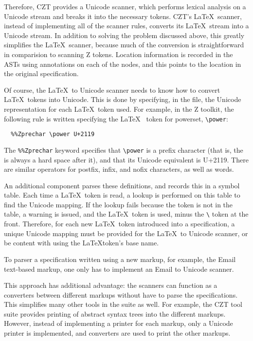 \documentclass{llncs}
\begin{document}
Therefore, CZT provides a Unicode scanner, which performs lexical
analysis on a Unicode stream and breaks it into the necessary
tokens. CZT's \LaTeX~scanner, instead of implementing all of the
scanner rules, converts its \LaTeX~stream into a Unicode stream. In
addition to solving the problem discussed above, this greatly
simplifies the \LaTeX~scanner, because much of the conversion is
straightforward in comparision to scanning Z tokens. Location
information is recorded in the ASTs using annotations on each of the
nodes, and this points to the location in the original specification.

Of course, the \LaTeX~to Unicode scanner needs to know how to convert
\LaTeX~tokens into Unicode. This is done by specifying, in the file,
the Unicode representation for each \LaTeX~token used. For example, in
the Z toolkit, the following rule is written specifying the \LaTeX~
token for powerset, \verb+\power+:
\begin{verbatim}
  %%Zprechar \power U+2119
\end{verbatim}

The {\tt \%\%Zprechar} keyword specifies that \verb+\power+ is a
prefix character (that is, the is always a hard space after it), and
that its Unicode equivalent is U+2119. There are similar operators for
postfix, infix, and nofix characters, as well as words.

An additional component parses these definitions, and records this in
a symbol table. Each time a \LaTeX~token is read, a lookup is
performed on this table to find the Unicode mapping. If the lookup
fails because the token is not in the table, a warning is issued, and
the \LaTeX~token is used, minus the \verb+\+ token at the
front. Therefore, for each new \LaTeX~token introduced into a
specification, a unique Unicode mapping must be provided for the
\LaTeX~to Unicode scanner, or be content with using the \LaTeX token's
base name.

To parser a specification written using a new markup, for example, the
Email text-based markup, one only has to implement an Email to Unicode
scanner.

This approach has additional advantage: the scanners can function as a
converters between different markups without have to parse the
specifications. This simplifies many other tools in the suite as
well. For example, the CZT tool suite provides printing of abstract
syntax trees into the different markups. However, instead of
implementing a printer for each markup, only a Unicode printer is
implemented, and converters are used to print the other markups.
\end{document}
